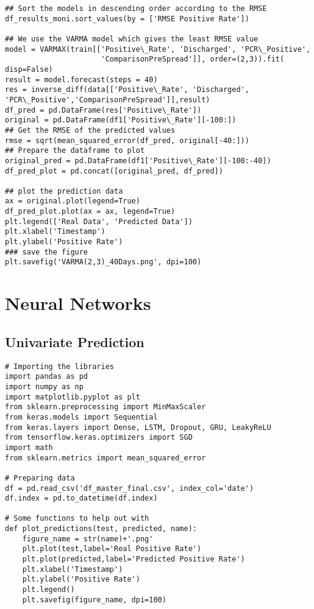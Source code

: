 \begin{appendices}
\begin{verbatim}
## Sort the models in descending order according to the RMSE
df_results_moni.sort_values(by = ['RMSE Positive Rate'])

## We use the VARMA model which gives the least RMSE value
model = VARMAX(train[['Positive\_Rate', 'Discharged', 'PCR\_Positive',
                      'ComparisonPreSpread']], order=(2,3)).fit( disp=False)
result = model.forecast(steps = 40)
res = inverse_diff(data[['Positive\_Rate', 'Discharged', 'PCR\_Positive','ComparisonPreSpread']],result)
df_pred = pd.DataFrame(res['Positive\_Rate'])
original = pd.DataFrame(df1['Positive\_Rate'][-100:])
## Get the RMSE of the predicted values
rmse = sqrt(mean_squared_error(df_pred, original[-40:]))
## Prepare the dataframe to plot
original_pred = pd.DataFrame(df1['Positive\_Rate'][-100:-40])
df_pred_plot = pd.concat([original_pred, df_pred])

## plot the prediction data
ax = original.plot(legend=True)
df_pred_plot.plot(ax = ax, legend=True)
plt.legend(['Real Data', 'Predicted Data'])
plt.xlabel('Timestamp')
plt.ylabel('Positive Rate')
### save the figure
plt.savefig('VARMA(2,3)_40Days.png', dpi=100)
\end{verbatim}

\section{Neural Networks}
\subsection{Univariate Prediction}
\begin{verbatim}
# Importing the libraries
import pandas as pd
import numpy as np
import matplotlib.pyplot as plt
from sklearn.preprocessing import MinMaxScaler
from keras.models import Sequential
from keras.layers import Dense, LSTM, Dropout, GRU, LeakyReLU
from tensorflow.keras.optimizers import SGD
import math
from sklearn.metrics import mean_squared_error

# Preparing data
df = pd.read_csv('df_master_final.csv', index_col='date')
df.index = pd.to_datetime(df.index)

# Some functions to help out with
def plot_predictions(test, predicted, name):
    figure_name = str(name)+'.png'
    plt.plot(test,label='Real Positive Rate')
    plt.plot(predicted,label='Predicted Positive Rate')
    plt.xlabel('Timestamp')
    plt.ylabel('Positive Rate')
    plt.legend()
    plt.savefig(figure_name, dpi=100)


\end{verbatim}
\end{appendices}
